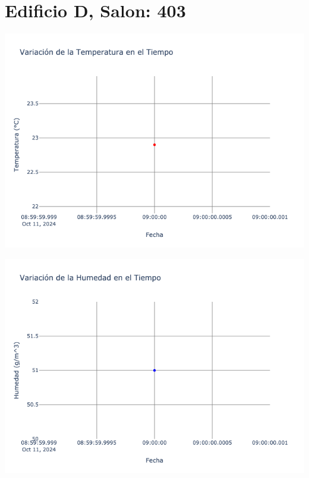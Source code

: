 \documentclass{article}
\begin{document}
    \section{Edificio D, Salon: 403}
    \noindent
    \begin{minipage}{0.48\textwidth}
        \centering
        \includegraphics[width=\textwidth]{../img/poli/TS403-90Dias-03-12-2024.png}
    \end{minipage}
    \hfill
    \begin{minipage}{0.48\textwidth}
        \centering
        \includegraphics[width=\textwidth]{../img/poli/HS403-90Dias-03-12-2024.png}
    \end{minipage}
\end{document}

